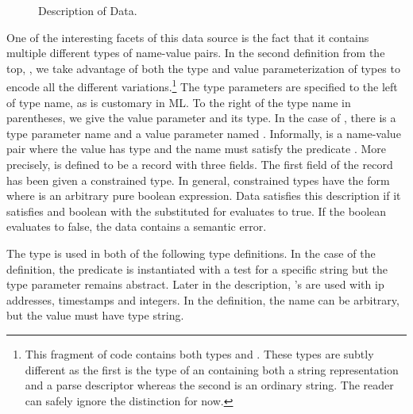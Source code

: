 
\begin{figure}
  \centering
  \small
  
  \caption{Description of \darkstar{} Data.}
  \label{fig:darkstar-ml}
\end{figure}

One of the interesting facets of this data source is the fact that
it contains multiple different types of name-value pairs.  In the
second definition from the top, , we take
advantage of both the type and value parameterization of types to
encode all the different 
variations.\footnote{This fragment of code contains both
types  and .  These types are subtly different
as the first is the type of an \pvalue{} containing both a string 
representation and a parse descriptor whereas the second is an 
ordinary string.  The reader can safely ignore the distinction for now.}    
The type parameters
are specified to the left of type name, as is customary in ML.
To the right of the type name in parentheses, we give the
value parameter and its type. 
In the case of , there is a type parameter name 
and a value parameter named .  Informally,
 is a name-value pair where the value has type 
and the name must satisfy the predicate .  More precisely,
 is defined to be
a record with three fields.  The first field of the record
has been given a constrained type.  In general, constrained types have the
form  where  is an arbitrary pure boolean 
expression.  Data  satisfies this description if it satisfies
 and boolean  with the \pvalue{}  substituted for 
evaluates to true.  If the boolean evaluates to false, the
data contains a semantic error.  

The  type is used in both of the following type definitions.
In the case of the  definition, the predicate is instantiated
with a test for a specific string but the type parameter remains 
abstract.  Later in the description, 's
are used with ip addresses, timestamps and integers. In the  
definition, the name can be arbitrary, but the value must have 
type string.

